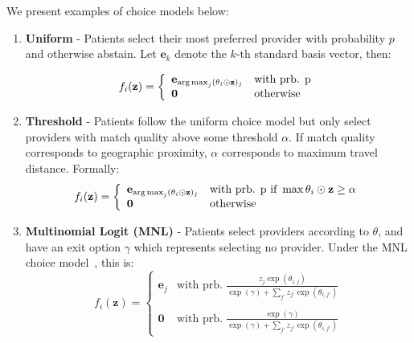 We present examples of choice models below: 
\begin{enumerate}
    \item \textbf{Uniform} - Patients select their most preferred provider with probability $p$ and otherwise abstain. 
    Let $\mathbf{e}_{k}$ denote the $k$-th standard basis vector, then: 
    
    \begin{equation}
    f_{i}(\mathbf{z}) =\left\{ \begin{array}{ll}
                \mathbf{e}_{\operatorname*{arg\,max}_{j} (\theta_{i} \odot \mathbf{z})_{j}} & \text{with prb. p}\\
                \mathbf{0} &\text{otherwise}
            \end{array} \right.
    \end{equation}

    \item \textbf{Threshold} - Patients follow the uniform choice model but only select providers with match quality above some threshold $\alpha$. If match quality corresponds to geographic proximity, $\alpha$ corresponds to maximum travel distance. 
Formally: 
    \begin{equation}
    f_{i}(\mathbf{z}) =\left\{ \begin{array}{ll}
                \mathbf{e}_{\operatorname*{arg\,max}_{j} (\theta_{i} \odot \mathbf{z})_{j}} & \text{with prb. p if } \max \theta_{i} \odot \mathbf{z} \geq \alpha \\
                \mathbf{0} &\text{otherwise}
            \end{array} \right.
    \end{equation}
    \item \textbf{Multinomial Logit (MNL)} - Patients select providers according to $\theta$, and have an exit option $\gamma$ which represents selecting no provider. Under the MNL choice model~\citep{choice_models_textbook}, this is:
    \begin{equation}
            f_{i}(\mathbf{z}) =\left\{ \begin{array}{ll}
                \mathbf{e}_{j} & \text{with prb. } \frac{z_{j}\exp(\theta_{i,j})}{\exp(\gamma) + \sum_{j'} z_{j'} \exp(\theta_{i,j'})}\\\\
                \mathbf{0} &\text{with prb. } \frac{\exp(\gamma)} {\exp(\gamma) + \sum_{j'} z_{j'} \exp(\theta_{i,j'})}
            \end{array} \right.
    \end{equation}
\end{enumerate}

